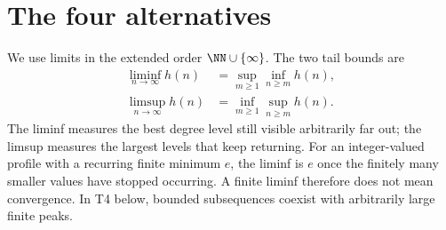 \section{The four alternatives}
We use limits in the extended order $\NN\cup\{\infty\}$.
The two tail bounds are
\[
 \begin{aligned}
 \liminf_{n\to\infty}h(n)&=\sup_{m\ge1}\inf_{n\ge m}h(n),\\
 \limsup_{n\to\infty}h(n)&=\inf_{m\ge1}\sup_{n\ge m}h(n).
 \end{aligned}
\]
The liminf measures the best degree level still visible arbitrarily
far out; the limsup measures the largest levels that keep returning.
For an integer-valued profile with a recurring finite minimum $e$,
the liminf is $e$ once the finitely many smaller values have stopped
occurring. A finite liminf therefore does not mean convergence.
In T4 below, bounded subsequences coexist with arbitrarily large
finite peaks.

